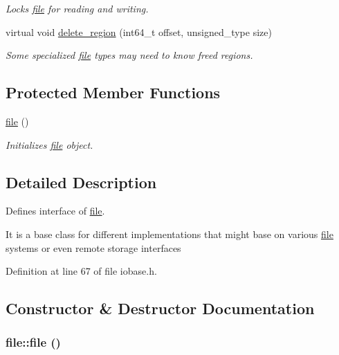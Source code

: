 \begin{CompactItemize}
\begin{CompactList}\small\item\em Locks \hyperlink{classfile}{file} for reading and writing. \item\end{CompactList}\item 
\hypertarget{group__iolayer_g1bb12d404c9a31564ba2c3c3e870ac49}{
virtual void \hyperlink{group__iolayer_g1bb12d404c9a31564ba2c3c3e870ac49}{delete\_\-region} (int64\_\-t offset, unsigned\_\-type size)}
\label{group__iolayer_g1bb12d404c9a31564ba2c3c3e870ac49}

\begin{CompactList}\small\item\em Some specialized \hyperlink{classfile}{file} types may need to know freed regions. \item\end{CompactList}\end{CompactItemize}
\subsection*{Protected Member Functions}
\begin{CompactItemize}
\item 
\hyperlink{classfile_22090815b0614f552f2cb2cc8f170572}{file} ()
\begin{CompactList}\small\item\em Initializes \hyperlink{classfile}{file} object. \item\end{CompactList}\end{CompactItemize}


\subsection{Detailed Description}
Defines interface of \hyperlink{classfile}{file}. 

It is a base class for different implementations that might base on various \hyperlink{classfile}{file} systems or even remote storage interfaces 

Definition at line 67 of file iobase.h.

\subsection{Constructor \& Destructor Documentation}
\hypertarget{classfile_22090815b0614f552f2cb2cc8f170572}{
\subsubsection[{file}]{\setlength{\rightskip}{0pt plus 5cm}file::file ()}}
\label{classfile_22090815b0614f552f2cb2cc8f170572}



